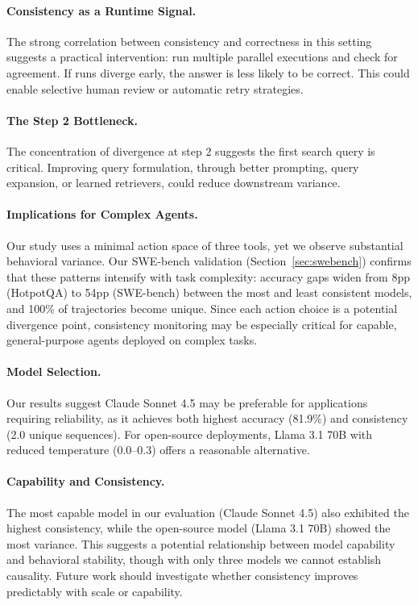 \documentclass{article}
\begin{document}
\paragraph{Consistency as a Runtime Signal.}
The strong correlation between consistency and correctness in this setting suggests a practical intervention: run multiple parallel executions and check for agreement. If runs diverge early, the answer is less likely to be correct. This could enable selective human review or automatic retry strategies.



\paragraph{The Step 2 Bottleneck.}
The concentration of divergence at step 2 suggests the first search query is critical. Improving query formulation, through better prompting, query expansion, or learned retrievers, could reduce downstream variance.

\paragraph{Implications for Complex Agents.}
Our study uses a minimal action space of three tools, yet we observe substantial behavioral variance. Our SWE-bench validation (Section~\ref{sec:swebench}) confirms that these patterns intensify with task complexity: accuracy gaps widen from 8pp (HotpotQA) to 54pp (SWE-bench) between the most and least consistent models, and 100\% of trajectories become unique. Since each action choice is a potential divergence point, consistency monitoring may be especially critical for capable, general-purpose agents deployed on complex tasks.

\paragraph{Model Selection.}
Our results suggest Claude Sonnet 4.5 may be preferable for applications requiring reliability, as it achieves both highest accuracy (81.9\%) and consistency (2.0 unique sequences). For open-source deployments, Llama 3.1 70B with reduced temperature (0.0--0.3) offers a reasonable alternative.

\paragraph{Capability and Consistency.}
The most capable model in our evaluation (Claude Sonnet 4.5) also exhibited the highest consistency, while the open-source model (Llama 3.1 70B) showed the most variance. This suggests a potential relationship between model capability and behavioral stability, though with only three models we cannot establish causality. Future work should investigate whether consistency improves predictably with scale or capability.
\end{document}
